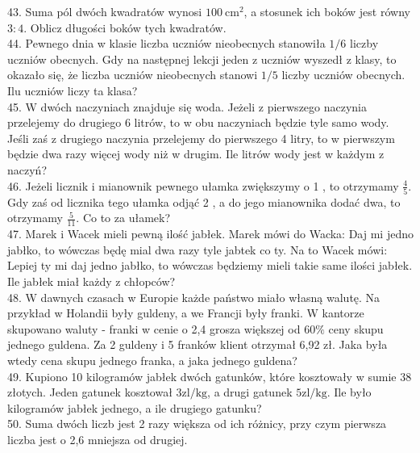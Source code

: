 \documentclass[10pt]{article}
\begin{document}
43. Suma pól dwóch kwadratów wynosi \(100 \mathrm{~cm}^{2}\), a stosunek ich boków jest równy \(3: 4\). Oblicz długości boków tych kwadratów.\\
44. Pewnego dnia w klasie liczba uczniów nieobecnych stanowiła \(1 / 6\) liczby uczniów obecnych. Gdy na następnej lekcji jeden z uczniów wyszedł z klasy, to okazało się, że liczba uczniów nieobecnych stanowi \(1 / 5\) liczby uczniów obecnych. Ilu uczniów liczy ta klasa?\\
45. W dwóch naczyniach znajduje się woda. Jeżeli z pierwszego naczynia przelejemy do drugiego 6 litrów, to w obu naczyniach będzie tyle samo wody. Jeśli zaś z drugiego naczynia przelejemy do pierwszego 4 litry, to w pierwszym będzie dwa razy więcej wody niż w drugim. Ile litrów wody jest w każdym z naczyń?\\
46. Jeżeli licznik i mianownik pewnego ułamka zwiększymy o 1 , to otrzymamy \(\frac{4}{5}\). Gdy zaś od licznika tego ułamka odjąć 2 , a do jego mianownika dodać dwa, to otrzymamy \(\frac{5}{11}\). Co to za ułamek?\\
47. Marek i Wacek mieli pewną ilość jabłek. Marek mówi do Wacka: Daj mi jedno jabłko, to wówczas będę mial dwa razy tyle jabtek co ty. Na to Wacek mówi: Lepiej ty mi daj jedno jabłko, to wówczas będziemy mieli takie same ilości jabłek. Ile jabłek miał każdy z chłopców?\\
48. W dawnych czasach w Europie każde państwo miało własną walutę. Na przykład w Holandii były guldeny, a we Francji były franki. W kantorze skupowano waluty - franki w cenie o 2,4 grosza większej od \(60 \%\) ceny skupu jednego guldena. Za 2 guldeny i 5 franków klient otrzymał 6,92 zł. Jaka była wtedy cena skupu jednego franka, a jaka jednego guldena?\\
49. Kupiono 10 kilogramów jabłek dwóch gatunków, które kosztowały w sumie 38 złotych. Jeden gatunek kosztował \(3 \mathrm{zl} / \mathrm{kg}\), a drugi gatunek \(5 \mathrm{zl} / \mathrm{kg}\). Ile było kilogramów jabłek jednego, a ile drugiego gatunku?\\
50. Suma dwóch liczb jest 2 razy większa od ich różnicy, przy czym pierwsza liczba jest o 2,6 mniejsza od drugiej.
\end{document}
